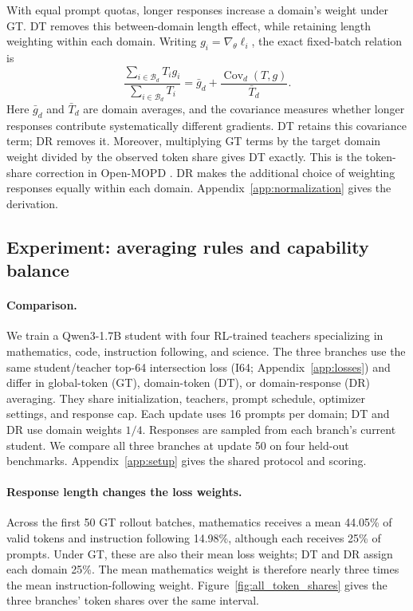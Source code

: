 With equal prompt quotas, longer responses increase a domain's weight under GT. DT removes this between-domain length effect, while retaining length weighting within each domain. Writing $g_i=\nabla_\theta\ell_i$, the exact fixed-batch relation is
\begin{equation}
\frac{\sum_{i\in\mathcal B_d}T_i g_i}{\sum_{i\in\mathcal B_d}T_i}
=\bar g_d+\frac{\operatorname{Cov}_d(T,g)}{\bar T_d}.
\label{eq:weighting}
\end{equation}
Here $\bar g_d$ and $\bar T_d$ are domain averages, and the covariance measures whether longer responses contribute systematically different gradients. DT retains this covariance term; DR removes it. Moreover, multiplying GT terms by the target domain weight divided by the observed token share gives DT exactly. This is the token-share correction in Open-MOPD \citep[Section~4.1, Eq.~(8)]{gao2026openmopddiagnosingfixingcapability}. DR makes the additional choice of weighting responses equally within each domain. Appendix~\ref{app:normalization} gives the derivation.

\subsection{Experiment: averaging rules and capability balance}

\paragraph{Comparison.}
We train a Qwen3-1.7B student with four RL-trained teachers specializing in mathematics, code, instruction following, and science. The three branches use the same student/teacher top-64 intersection loss (I64; Appendix~\ref{app:losses}) and differ in global-token (GT), domain-token (DT), or domain-response (DR) averaging. They share initialization, teachers, prompt schedule, optimizer settings, and response cap. Each update uses 16 prompts per domain; DT and DR use domain weights $1/4$. Responses are sampled from each branch's current student. We compare all three branches at update 50 on four held-out benchmarks. Appendix~\ref{app:setup} gives the shared protocol and scoring.

\paragraph{Response length changes the loss weights.}
Across the first 50 GT rollout batches, mathematics receives a mean 44.05\% of valid tokens and instruction following 14.98\%, although each receives 25\% of prompts. Under GT, these are also their mean loss weights; DT and DR assign each domain 25\%. The mean mathematics weight is therefore nearly three times the mean instruction-following weight. Figure~\ref{fig:all_token_shares} gives the three branches' token shares over the same interval.

